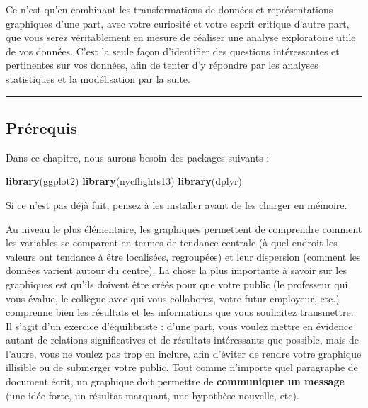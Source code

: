 \documentclass[a4paperpaper,]{article}
\newenvironment{Shaded}{\begin{snugshade}}{\end{snugshade}}
\newcommand{\KeywordTok}[1]{\textcolor[rgb]{0.12,0.11,0.11}{\textbf{#1}}}
\newcommand{\NormalTok}[1]{\textcolor[rgb]{0.12,0.11,0.11}{#1}}
\theoremstyle{definition}
\theoremstyle{definition}
\theoremstyle{definition}
\theoremstyle{remark}
\begin{document}
Ce n'est qu'en combinant les transformations de données et
représentations graphiques d'une part, avec votre curiosité et votre
esprit critique d'autre part, que vous serez véritablement en mesure de
réaliser une analyse exploratoire utile de vos données. C'est la seule
façon d'identifier des questions intéressantes et pertinentes sur vos
données, afin de tenter d'y répondre par les analyses statistiques et la
modélisation par la suite.

\begin{center}\rule{0.5\linewidth}{\linethickness}\end{center}

\hypertarget{prerequis}{%
\subsection{Prérequis}\label{prerequis}}

Dans ce chapitre, nous aurons besoin des packages suivants :

\begin{Shaded}
\begin{Highlighting}[]
\KeywordTok{library}\NormalTok{(ggplot2)}
\KeywordTok{library}\NormalTok{(nycflights13)}
\KeywordTok{library}\NormalTok{(dplyr)}
\end{Highlighting}
\end{Shaded}

Si ce n'est pas déjà fait, pensez à les installer avant de les charger
en mémoire.

Au niveau le plus élémentaire, les graphiques permettent de comprendre
comment les variables se comparent en termes de tendance centrale (à
quel endroit les valeurs ont tendance à être localisées, regroupées) et
leur dispersion (comment les données varient autour du centre). La chose
la plus importante à savoir sur les graphiques est qu'ils doivent être
créés pour que votre public (le professeur qui vous évalue, le collègue
avec qui vous collaborez, votre futur employeur, etc.) comprenne bien
les résultats et les informations que vous souhaitez transmettre. Il
s'agit d'un exercice d'équilibriste : d'une part, vous voulez mettre en
évidence autant de relations significatives et de résultats intéressants
que possible, mais de l'autre, vous ne voulez pas trop en inclure, afin
d'éviter de rendre votre graphique illisible ou de submerger votre
public. Tout comme n'importe quel paragraphe de document écrit, un
graphique doit permettre de \textbf{communiquer un message} (une idée
forte, un résultat marquant, une hypothèse nouvelle, etc).
\end{document}
